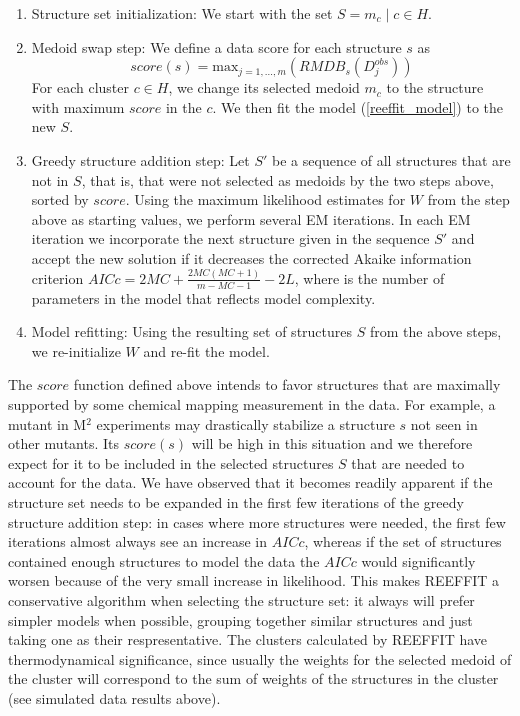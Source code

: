 \documentclass[12pt]{article}
\begin{document}
\begin{enumerate}
\item Structure set initialization: We start with the set $S = {m_c \mid c \in H}$.
\item Medoid swap step: We define a data score for each structure $s$ as 
\[score(s) = \mbox{max}_{j = 1, ..., m}(RMDB_{s}(D^{obs}_{j}))\]
For each cluster $c \in H$, we change its selected medoid $m_c$ to the structure with maximum $score$ in the $c$. We then fit the model (\ref{reeffit_model}) to the new $S$.
\item Greedy structure addition step: Let $S'$ be a sequence of all structures that are not in $S$, that is, that were not selected as medoids by the two steps above, sorted by $score$. Using the maximum likelihood estimates for $W$ from the step above as starting values, we perform several EM iterations. In each EM iteration we incorporate the next structure given in the sequence $S'$ and accept the new solution if it decreases the corrected Akaike information criterion $AICc = 2MC +  \frac{2MC(MC+1)}{m-MC-1}  - 2L$, where is the number of parameters in the model that reflects model complexity.
\item Model refitting: Using the resulting set of structures $S$ from the above steps, we re-initialize $W$ and re-fit the model.
\end{enumerate}

The $score$ function defined above intends to favor structures that are maximally supported by some chemical mapping measurement in the data. 
For example, a mutant in M$^2$ experiments may drastically stabilize a structure $s$ not seen in other mutants. 
Its $score(s)$ will be high in this situation and we therefore expect for it to be included in the selected structures $S$ that are needed to account for the data. 
We have observed that it becomes readily apparent if the structure set needs to be expanded in the first few iterations of the greedy structure addition step: in cases where more structures were needed, the first few iterations almost always see an increase in $AICc$, whereas if the set of structures contained enough structures to model the data the $AICc$ would significantly worsen because of the very small increase in likelihood. 
This makes REEFFIT a conservative algorithm when selecting the structure set: it always will prefer simpler models when possible, grouping together similar structures and just taking one as their respresentative. 
The clusters calculated by REEFFIT have thermodynamical significance, since usually the weights for the selected medoid of the cluster will correspond to the sum of weights of the structures in the cluster (see simulated data results above).
\end{document}
